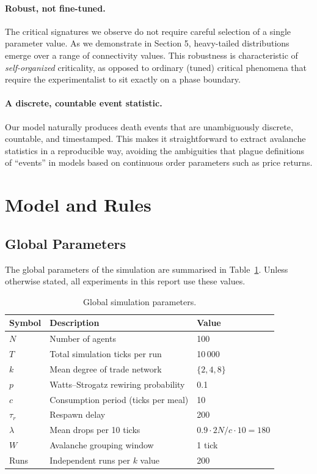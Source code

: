 \documentclass[11pt,a4paper]{article}
\begin{document}
\paragraph{Robust, not fine-tuned.} The critical signatures we observe do
not require careful selection of a single parameter value. As we
demonstrate in Section 5, heavy-tailed distributions emerge over a range
of connectivity values. This robustness is characteristic of
\emph{self-organized} criticality, as opposed to ordinary (tuned) critical
phenomena that require the experimentalist to sit exactly on a phase
boundary.

\paragraph{A discrete, countable event statistic.} Our model naturally
produces death events that are unambiguously discrete, countable, and
timestamped. This makes it straightforward to extract avalanche statistics
in a reproducible way, avoiding the ambiguities that plague definitions of
``events'' in models based on continuous order parameters such as price
returns.

\section{Model and Rules}

\subsection{Global Parameters}

The global parameters of the simulation are summarised in
Table~\ref{tab:params}. Unless otherwise stated, all experiments in this
report use these values.

\begin{table}[H]
\centering
\caption{Global simulation parameters.}
\label{tab:params}
\begin{tabular}{lll}
\hline
Symbol & Description & Value \\
\hline
$N$ & Number of agents & 100 \\
$T$ & Total simulation ticks per run & 10\,000 \\
$k$ & Mean degree of trade network & $\{2, 4, 8\}$ \\
$p$ & Watts--Strogatz rewiring probability & 0.1 \\
$c$ & Consumption period (ticks per meal) & 10 \\
$\tau_r$ & Respawn delay & 200 \\
$\lambda$ & Mean drops per 10 ticks & $0.9 \cdot 2N/c \cdot 10 = 180$ \\
$W$ & Avalanche grouping window & 1 tick \\
Runs & Independent runs per $k$ value & 200 \\
\hline
\end{tabular}
\end{table}
\end{document}

